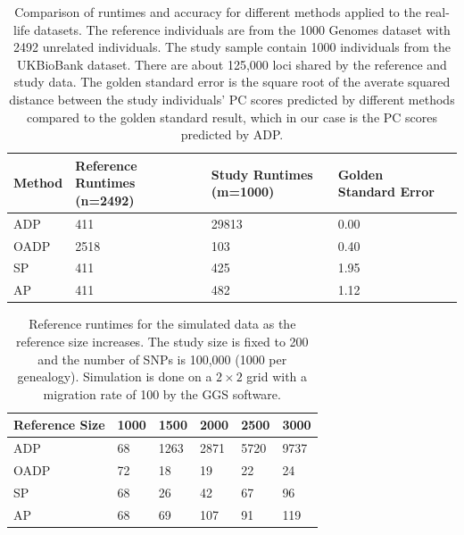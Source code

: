 \documentclass{article}
\begin{document}
\begin{table} 
  \centering
  \begin{tabular}{|l|l|l|l|l|}
    \hline
    Method & Reference Runtimes (n=2492) & Study Runtimes (m=1000)& Golden Standard Error \\ 
    \hline
    ADP & 411 & 29813 & 0.00 \\
    \hline
    OADP & 2518 & 103 & 0.40 \\
    \hline
    SP & 411 & 425 & 1.95 \\
    \hline
    AP & 411 & 482 & 1.12 \\
    \hline
  \end{tabular}
  \caption{
    Comparison of runtimes and accuracy for different methods applied to the real-life datasets.
    The reference individuals are from the 1000 Genomes dataset with 2492 unrelated individuals.
    The study sample contain 1000 individuals from the UKBioBank dataset.
    There are about 125,000 loci shared by the reference and study data.
    The golden standard error is the square root of the averate squared distance between the study individuals' PC scores predicted by different methods compared to the golden standard result, which in our case is the PC scores predicted by ADP.
  }
  \label{tbl:ukb}
\end{table} 

\begin{table}
  \centering
  \begin{tabular}{|l|l|l|l|l|l|}
    \hline
    Reference Size & 1000 & 1500 & 2000 & 2500 & 3000 \\
    \hline
    ADP        &  68  & 1263 & 2871 & 5720 & 9737 \\
    OADP       &  72  & 18   & 19   & 22   & 24   \\
    SP         &  68  & 26   & 42   & 67   & 96   \\
    AP         &  68  & 69   & 107  & 91   & 119  \\
    \hline
  \end{tabular}
  \caption{
    Reference runtimes for the simulated data as the reference size increases.
    The study size is fixed to 200 and the number of SNPs is 100,000 (1000 per genealogy). 
    Simulation is done on a $2 \times 2$ grid with a migration rate of 100 by the GGS software. 
  }
  \label{tbl:nChg-runtimes-ref}
\end{table}
\end{document}
